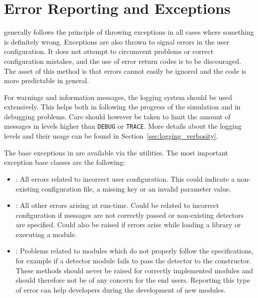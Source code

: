 \section{Error Reporting and Exceptions}
\label{sec:error_reporting_exceptions}
\apsq generally follows the principle of throwing exceptions in all cases where something is definitely wrong.
Exceptions are also thrown to signal errors in the user configuration.
It does not attempt to circumvent problems or correct configuration mistakes, and the use of error return codes is to be discouraged.
The asset of this method is that errors cannot easily be ignored and the code is more predictable in general.

For warnings and information messages, the logging system should be used extensively.
This helps both in following the progress of the simulation and in debugging problems.
Care should however be taken to limit the amount of messages in levels higher than \texttt{DEBUG} or \texttt{TRACE}.
More details about the logging levels and their usage can be found in Section~\ref{sec:logging_verbosity}.

The base exceptions in \apsq are available via the utilities.
The most important exception base classes are the following:
\begin{itemize}
\item {}: All errors related to incorrect user configuration.
This could indicate a non-existing configuration file, a missing key or an invalid parameter value.
\item {}: All other errors arising at run-time.
Could be related to incorrect configuration if messages are not correctly passed or non-existing detectors are specified.
Could also be raised if errors arise while loading a library or executing a module.
\item {}: Problems related to modules which do not properly follow the specifications, for example if a detector module fails to pass the detector to the constructor.
These methods should never be raised for correctly implemented modules and should therefore not be of any concern for the end users.
Reporting this type of error can help developers during the development of new modules.
\end{itemize}

